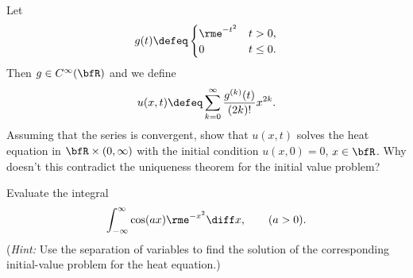 \begin{problem}
  Let
  \[
    g(t)\defeq
    \begin{cases}
      \rme^{-t^2}&t>0,\\
      0&t\leq 0.
    \end{cases}
  \]
  Then \(g\in C^\infty(\bfR)\) and we define
  \[
    u(x,t)\defeq\sum_{k=0}^\infty\frac{g^{(k)}(t)}{(2k)!}x^{2k}.
  \]
  Assuming that the series is convergent, show that \(u(x,t)\) solves the
  heat equation in \(\bfR\times(0,\infty)\) with the initial condition
  \(u(x,0)=0\), \(x\in\bfR\). Why doesn't this contradict the uniqueness
  theorem for the initial value problem?
\end{problem}
\begin{solution}
\end{solution}
\newpage

\begin{problem}
  Evaluate the integral
  \[
    \int_{-\infty}^\infty \cos(ax)\rme^{-x^2}\diff x,\qquad (a>0).
  \]
  \noindent (\emph{Hint:} Use the separation of variables to find the
  solution of the corresponding initial-value problem for the heat
  equation.)
\end{problem}
\begin{solution}
\end{solution}

